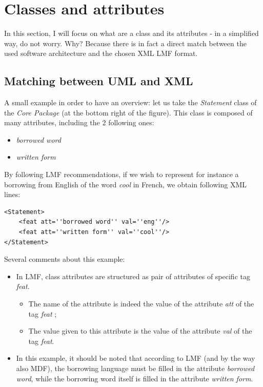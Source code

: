 \documentclass[a4paper,12pt]{article}
\begin{document}
\newpage
\section{Classes and attributes}

In this section, I will focus on what are a class and its attributes - in a simplified way, do not worry. Why? Because there is in fact a direct match between the used software architecture and the chosen XML LMF format.

\subsection{Matching between UML and XML}

A small example in order to have an overview: let us take the \textit{Statement} class of the \textit{Core Package} (at the bottom right of the figure). This class is composed of many attributes, including the 2 following ones:
\begin{itemize}
\item \textit{borrowed word}
\item \textit{written form}
\end{itemize}
By following LMF recommendations, if we wish to represent for instance a borrowing from English of the word \textit{cool} in French, we obtain following XML lines:
\begin{lstlisting}
<Statement>
	<feat att=''borrowed word'' val=''eng''/>
	<feat att=''written form'' val=''cool''/>
</Statement>
\end{lstlisting}
Several comments about this example:
\begin{itemize}
\item In LMF, class attributes are structured as pair of attributes of specific tag \textit{feat}.
\begin{itemize}
\item The name of the attribute is indeed the value of the attribute \textit{att} of the tag \textit{feat} ;
\item The value given to this attribute is the value of the attribute \textit{val} of the tag \textit{feat}.
\end{itemize}
\item In this example, it should be noted that according to LMF (and by the way also MDF), the borrowing language must be filled in the attribute \textit{borrowed word}, while the borrowing word itself is filled in the attribute \textit{written form}.
\end{itemize}
\end{document}
